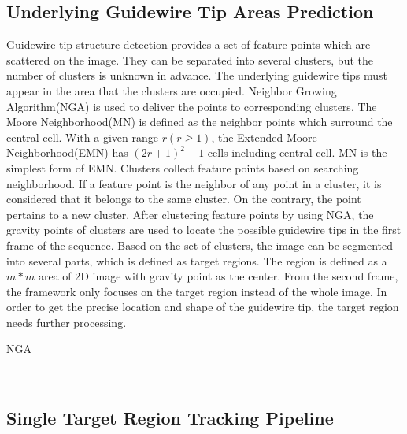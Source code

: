 \documentclass[journal]{IEEEtran}
\begin{document}
\subsection{Underlying Guidewire Tip Areas Prediction}
Guidewire tip structure detection provides a set of feature points which are scattered on the image. They can be separated into several clusters, but the number of clusters is unknown in advance. The underlying guidewire tips must appear in the area that the clusters are occupied. Neighbor Growing Algorithm(NGA) is used to deliver the points to corresponding clusters. The Moore Neighborhood(MN) is defined as the neighbor points which surround the central cell. With a given range $r (r \geq  1)$, the Extended Moore Neighborhood(EMN) has $(2r+1)^2-1$ cells including central cell. MN is the simplest form of EMN.
Clusters collect feature points based on searching neighborhood. If a feature point is the neighbor of any point in a cluster, it is considered that it belongs to the same cluster. On the contrary, the point pertains to a new cluster. After clustering feature points by using NGA, the gravity points of clusters are used to locate the possible guidewire tips in the first frame of the sequence. Based on the set of clusters, the image can be segmented into several parts, which is defined as target regions. The region is defined as a $m*m$ area of 2D image with gravity point as the center. From the second frame, the framework only focuses on the target region instead of the whole image. In order to get the precise location and shape of the guidewire tip, the target region needs further processing.
\begin{algorithm}[bt]
\setlength{\abovedisplayskip}{3pt}
\setlength{\belowdisplayskip}{-3pt}
	\caption{NGA}
		\
		\
\end{algorithm}


\subsection{Single Target Region Tracking Pipeline} 
\end{document}
